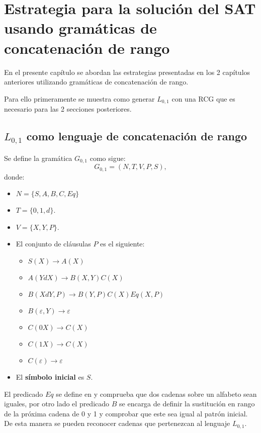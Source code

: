 \chapter{Estrategia para la solución del SAT usando gramáticas de concatenación de rango}

En el presente capítulo se abordan las estrategias presentadas en los 2 capítulos anteriores utilizando gramáticas de concatenación
de rango.

Para ello primeramente se muestra como generar $L_{0,1}$ con una RCG que es necesario para las 2 secciones posteriores.

\section{$L_{0,1}$ como lenguaje de concatenación de rango}

Se define la gramática $G_{0,1}$ como sigue:
\[
    G_{0,1} = (N, T, V, P, S),
\]
donde:

\begin{itemize}
    \item $N=\{S,A,B,C,Eq\}$
    \item $T=\{0,1,d\}$.
    \item $V=\{X,Y,P\}$.
    \item El conjunto de cláusulas $P$ es el siguiente:
          \begin{itemize}
              \item  $S(X)\to A(X)$
              \item $A(YdX)\to B(X,Y)C(X)$
              \item $B(XdY,P)\to B(Y,P) C(X) Eq(X,P)$
              \item $B(\varepsilon,Y)\to \varepsilon$
              \item $C(0X)\to C(X)$
              \item $C(1X)\to C(X)$
              \item $C(\varepsilon)\to \varepsilon$
          \end{itemize}
    \item El \textbf{símbolo inicial} es $S$.
\end{itemize}

El predicado $Eq$ se define en \cite{mainRCGBib} y comprueba que dos cadenas sobre un alfabeto sean iguales,
por otro lado el predicado $B$ se encarga de definir la sustitución en rango de la próxima cadena de 0 y 1 y
comprobar que este sea igual al patrón inicial. De esta manera se pueden reconocer cadenas que pertenezcan al lenguaje $L_{0,1}$.

